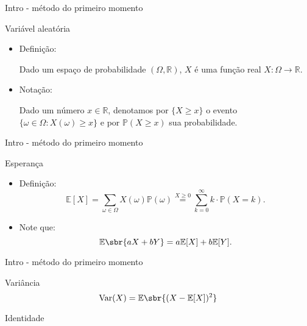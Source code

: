 \documentclass{beamer}
\DeclareMathOperator{\var}{Var}
\begin{document}
    \begin{frame}{Intro - método do primeiro momento}
        \begin{block}{Variável aleatória}
            \begin{itemize}
                \item Definição:

                Dado um espaço de probabilidade $(\Omega,\mathbb{R})$, $X$ é uma função real
                $X\colon\Omega\rightarrow\mathbb{R}$.
                \item Notação:

                Dado um número $x\in\mathbb{R}$, denotamos por $\{X\geqslant x\}$ o
                evento $\{\omega\in\Omega\colon X(\omega)\geqslant x\}$ e por
                $\mathbb{P}(X\geqslant x)$ sua probabilidade.
            \end{itemize}
        \end{block}
    \end{frame}

    \begin{frame}{Intro - método do primeiro momento}
        \begin{block}{Esperança}
            \begin{itemize}
                \item Definição:
                \[
                \mathbb{E}[X] = \sum_{\omega\in\Omega} X(\omega) \mathbb{P}(\omega)
                \overset{X\geqslant0}{=} \sum_{k=0}^\infty k\cdot\mathbb{P}(X=k).\]
                \item Note que:
                \[\mathbb{E}\sbr{aX+bY}=a\mathbb{E}[X]+b\mathbb{E}[Y].\]
            \end{itemize}
        \end{block}
    \end{frame}

    \begin{frame}{Intro - método do primeiro momento}
        \vspace{-1cm}
        \begin{block}{Variância}
            \[\var(X)=\mathbb{E}\sbr{(X-\mathbb{E}[X])^2}\]
        \end{block} \pause
        \begin{exampleblock}{Identidade}
        \end{exampleblock} \vspace{\stretch2}
    \end{frame}
\end{document}

